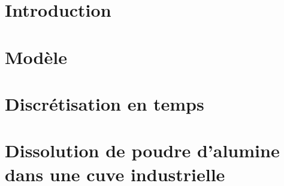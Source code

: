 \section{Introduction}
\label{sec:populations-introduction}


\section{Modèle}
\label{sec:populations-model}


\section{Discrétisation en temps}
\label{sec:populations-discretisation}


\section{Dissolution de poudre d'alumine dans une cuve industrielle}
\label{sec:populations-industriel}

